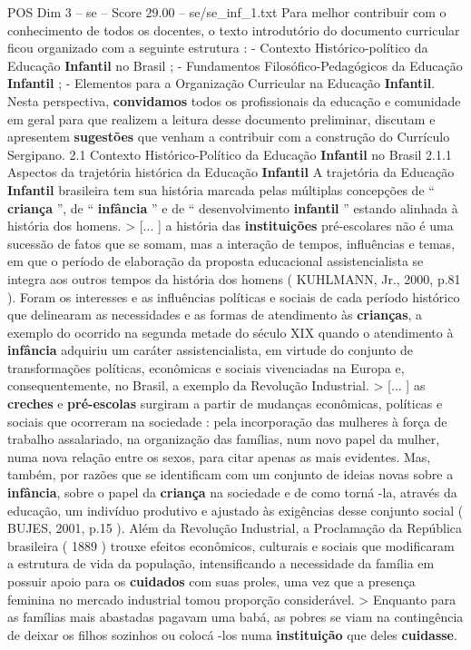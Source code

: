 \begin{textsample}{POS Dim 3 – se – Score 29.00 – se/se\_inf\_1.txt}
Para melhor contribuir com o conhecimento de todos os docentes, o texto introdutório do documento curricular ficou organizado com a seguinte estrutura : - Contexto Histórico-político da Educação \textbf{Infantil} no Brasil ; - Fundamentos Filosófico-Pedagógicos da Educação \textbf{Infantil} ; - Elementos para a Organização Curricular na Educação \textbf{Infantil}.
Nesta perspectiva, \textbf{convidamos} todos os profissionais da educação e comunidade em geral para que realizem a leitura desse documento preliminar, discutam e apresentem \textbf{sugestões} que venham a contribuir com a construção do Currículo Sergipano. 2.1 Contexto Histórico-Político da Educação \textbf{Infantil} no Brasil 2.1.1 Aspectos da trajetória histórica da Educação \textbf{Infantil} A trajetória da Educação \textbf{Infantil} brasileira tem sua história marcada pelas múltiplas concepções de “ \textbf{criança} ”, de “ \textbf{infância} ” e de “ desenvolvimento \textbf{infantil} ” estando alinhada à história dos homens. > [... ] a história das \textbf{instituições} pré-escolares não é uma sucessão de fatos que se somam, mas a interação de tempos, influências e temas, em que o período de elaboração da proposta educacional assistencialista se integra aos outros tempos da história dos homens ( KUHLMANN, Jr., 2000, p.81 ).
Foram os interesses e as influências políticas e sociais de cada período histórico que delinearam as necessidades e as formas de atendimento às \textbf{crianças}, a exemplo do ocorrido na segunda metade do século XIX quando o atendimento à \textbf{infância} adquiriu um caráter assistencialista, em virtude do conjunto de transformações políticas, econômicas e sociais vivenciadas na Europa e, consequentemente, no Brasil, a exemplo da Revolução Industrial. > [... ] as \textbf{creches} e \textbf{pré-escolas} surgiram a partir de mudanças econômicas, políticas e sociais que ocorreram na sociedade : pela incorporação das mulheres à força de trabalho assalariado, na organização das famílias, num novo papel da mulher, numa nova relação entre os sexos, para citar apenas as mais evidentes.
Mas, também, por razões que se identificam com um conjunto de ideias novas sobre a \textbf{infância}, sobre o papel da \textbf{criança} na sociedade e de como torná -la, através da educação, um indivíduo produtivo e ajustado às exigências desse conjunto social ( BUJES, 2001, p.15 ).
Além da Revolução Industrial, a Proclamação da República brasileira ( 1889 ) trouxe efeitos econômicos, culturais e sociais que modificaram a estrutura de vida da população, intensificando a necessidade da família em possuir apoio para os \textbf{cuidados} com suas proles, uma vez que a presença feminina no mercado industrial tomou proporção considerável. > Enquanto para as famílias mais abastadas pagavam uma babá, as pobres se viam na contingência de deixar os filhos sozinhos ou colocá -los numa \textbf{instituição} que deles \textbf{cuidasse}.

\end{textsample}
